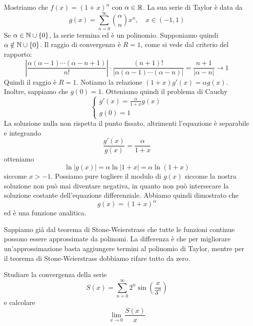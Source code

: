 \documentclass[a4paper]{article}
\begin{document}
\begin{radioactive}
\begin{snippetexample}{}
    Mostriamo che \(f(x) = (1 + x)^\alpha\) con \(\alpha \in \mathbb{R}\).
    La sua serie di Taylor è data da
    \[
        g(x) = \sum_{n=0}^\infty \binom{\alpha}{n}x^n, \quad x\in(-1,1)
    \]
    Se \(\alpha\in\mathbb{N}\cup\{0\}\), la serie termina ed è un polinomio.
    Supponiamo quindi \(\alpha\notin\mathbb{N}\cup\{0\}\). Il raggio di convergenza è
    \(R=1\), come si vede dal criterio del rapporto:
    \[
        \left|
        \frac{\alpha(\alpha-1)\cdots(\alpha - n + 1)}{n!}
        \right|\cdot\frac{(n+1)!}{|\alpha(\alpha-1)\cdots(\alpha-n)|}
        = \frac{n+1}{|\alpha- n|} \to 1
    \]
    Quindi il raggio è \(R=1\).
    Notiamo la relazione \((1 + x)g'(x) = \alpha g(x)\).
    Inoltre, sappiamo che \(g(0) = 1\).
    Otteniamo quindi il problema di Cauchy
    \[
        \begin{cases}
            g'(x) = \frac{\alpha}{1 + x}g(x) \\
            g(0) = 1
        \end{cases}
    \]
    La soluzione nulla non rispetta il punto fissato, altrimenti l'equazione è separabile e integrando
    \[
        \frac{g'(x)}{g(x)} = \frac{\alpha}{1 + x}
    \]
    otteniamo
    \[
        \ln|g(x)| = \alpha \ln |1 + x| =  \alpha \ln (1 + x)
    \]
    siccome \(x > -1\). Possiamo pure togliere il modulo di \(g(x)\)
    siccome la nostra soluzione non può mai diventare negativa, in quanto non può
    intersecare la soluzione costante dell'equazione differenziale. Abbiamo quindi dimostrato che
    \[
        g(x) = {(1 + x)}^\alpha
    \]
    ed è una funzione analitica.
\end{snippetexample}
\end{radioactive}

\begin{radioactive}
Sappiamo già dal teorema di Stone-Weierstrass che tutte le funzioni continue
possono essere approssimate da polinomi.
La differenza è che per migliorare un'approssimazione basta aggiungere termini
al polinomio di Taylor, mentre per il teorema di Stone-Weierstrass
dobbiamo rifare tutto da zero.
\end{radioactive}

\begin{radioactive}
\begin{snippetexercise}{}
    Studiare la convergenza della serie
    \[
        S(x) = \sum_{n=0}^\infty 2^n \sin\left(\frac{x}{3^n}\right)
    \]
    e calcolare
    \[
        \lim_{x \to 0} \frac{S(x)}{x}
    \]
\end{snippetexercise}
\end{radioactive}
\end{document}
